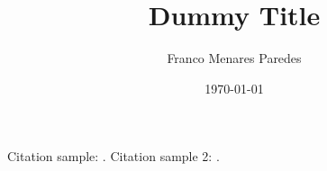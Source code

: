 \documentclass[12pt]{article}
\title{Dummy Title}
\author{Franco Menares Paredes}
\date{\today}
\begin{document}
\maketitle

\begin{abstract}
\lipsum[1]
\end{abstract}

\lipsum[1]

Citation sample: \cite{bradley2014aggregating}. Citation sample 2: .

\newpage


\end{document}

